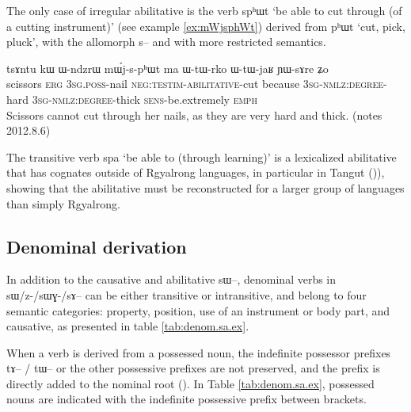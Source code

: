 \documentclass[oldfontcommands,oneside,a4paper,11pt]{article}
\newcommand{\ipa}[1]{{\phon \mbox{#1}}} %
\begin{document}
 

The only case of irregular abilitative is the verb \ipa{spʰɯt} `be able to cut through (of a cutting instrument)' (see example \ref{ex:mWjsphWt}) derived from \ipa{pʰɯt} `cut, pick, pluck', with the   allomorph \ipa{s--} and with more restricted semantics.

 \begin{exe}
\ex \label{ex:mWjsphWt}
\gll
\ipa{tsɤntu} 	\ipa{kɯ} 	\ipa{ɯ-ndzrɯ} 	\ipa{mɯ́j-s-pʰɯt} 	\ipa{ma} 	\ipa{ɯ-tɯ-rko} 	\ipa{ɯ-tɯ-jaʁ} 	\ipa{ɲɯ-sɤre} 	\ipa{ʑo} \\
scissors \textsc{erg} \textsc{3sg.poss}-nail \textsc{neg:testim-abilitative}-cut because \textsc{3sg-nmlz:degree}-hard \textsc{3sg-nmlz:degree}-thick \textsc{sens}-be.extremely \textsc{emph} \\
\glt Scissors cannot cut through her nails, as they are very hard and thick. (notes 2012.8.6)
   \end{exe}
   
The transitive verb \ipa{spa} `be able to (through learning)' is a lexicalized abilitative that has cognates outside of Rgyalrong languages, in particular in Tangut (\citealt[255-6]{jacques14esquisse})), showing that the abilitative must be reconstructed for a larger group of languages than simply Rgyalrong.


\subsection{Denominal derivation}
In addition to the causative and abilitative \ipa{sɯ--}, denominal verbs in \ipa{sɯ/z-/sɯɣ-/sɤ--} can be either transitive or intransitive, and belong to four semantic categories: property, position, use of an instrument or body part, and causative, as presented in table \ref{tab:denom.sa.ex}.

When a verb is derived from a possessed noun, the indefinite possessor prefixes \ipa{tɤ--} / \ipa{tɯ--} or the other possessive prefixes are not preserved, and the prefix is directly added to the nominal root  (\citealt{jacques14antipassive}). In Table \ref{tab:denom.sa.ex}, possessed nouns are indicated with the indefinite possessive prefix between brackets.
 
\end{document}
